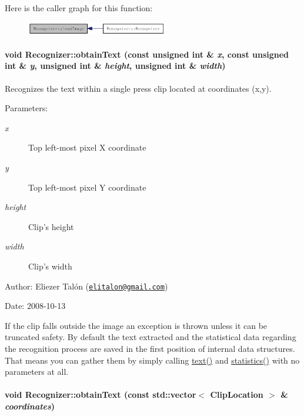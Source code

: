 Here is the caller graph for this function:\nopagebreak
\begin{figure}[H]
\begin{center}
\leavevmode
\includegraphics[width=175pt]{class_recognizer_acc4244738f2577a0c344c3b3af22eb0_icgraph}
\end{center}
\end{figure}
\hypertarget{class_recognizer_d117f344b1f77711e6cbab0f15dbc269}{
\paragraph[{obtainText}]{\setlength{\rightskip}{0pt plus 5cm}void Recognizer::obtainText (const unsigned int \& {\em x}, \/  const unsigned int \& {\em y}, \/  unsigned int \& {\em height}, \/  unsigned int \& {\em width})}\hfill}
\label{class_recognizer_d117f344b1f77711e6cbab0f15dbc269}


Recognizes the text within a single press clip located at coordinates (x,y). 

\begin{Desc}
\item[Parameters:]
\begin{description}
\item[{\em x}]Top left-most pixel X coordinate \item[{\em y}]Top left-most pixel Y coordinate \item[{\em height}]Clip's height \item[{\em width}]Clip's width\end{description}
\end{Desc}
\begin{Desc}
\item[Author:]Eliezer Talón (\href{mailto:elitalon@gmail.com}{\tt elitalon@gmail.com}) \end{Desc}
\begin{Desc}
\item[Date:]2008-10-13\end{Desc}
If the clip falls outside the image an exception is thrown unless it can be truncated safety. By default the text extracted and the statistical data regarding the recognition process are saved in the first position of internal data structures. That means you can gather them by simply calling \hyperlink{class_recognizer_c5d20b511888a60a6c1a81c0a4206ec2}{text()} and \hyperlink{class_recognizer_8b38356d2741969e67cd6b4f507897ba}{statistics()} with no parameters at all. \hypertarget{class_recognizer_4b3b27b3746edcf831d142eddfb81f19}{
\paragraph[{obtainText}]{\setlength{\rightskip}{0pt plus 5cm}void Recognizer::obtainText (const std::vector$<$ {\bf ClipLocation} $>$ \& {\em coordinates})}\hfill}
\label{class_recognizer_4b3b27b3746edcf831d142eddfb81f19}


